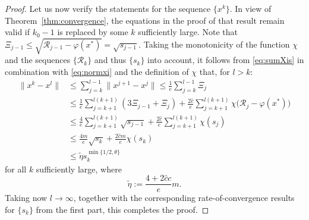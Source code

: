 \documentclass[10pt,a4paper]{amsart}
\newcommand{\Rvalue}{\mathcal{R}}
\newcommand{\xk}{x^k}
\begin{document}
\begin{proof}
Let us now verify the statements for the sequence $\{\xk\}$. In view of Theorem~\ref{thm:convergence}, the equations in the proof of that result remain valid if $k_0-1$ is replaced by some $k$ sufficiently large. Note that $\Xi_{j-1} \leq \sqrt{\Rvalue_{j-1} - \varphi(x^*)} = \sqrt{s_{j-1}}$. Taking the monotonicity of the function $\chi$ and the sequences $\{\Rvalue_k\}$ and thus $\{s_k\}$ into account, it follows from \eqref{eq:sumXis} in combination with \eqref{eq:normxi} and the definition of $\chi$ that, for $l>k$:
\begin{align*}
	\|\xk - x^l\| &\leq \sum_{j=k}^{l-1} \|x^{j+1}-x^j\| \leq \frac{1}{e} \sum_{j=k}^{l-1} \Xi_j  \\
	&\leq \frac{1}{e} \sum_{j=k+1}^{l(k+1)} (3\Xi_{j-1} + \Xi_j) + \frac{2 \hat c}{e} \sum_{j = k+1}^{l(k+1)}\chi \big( \Rvalue_j - \varphi(x^*) \big)\\
	&\leq \frac{4}{e} \sum_{j=k+1}^{l(k+1)} \sqrt{s_{j-1}} + \frac{2 \hat c}{e} \sum_{j = k+1}^{l(k+1)}\chi ( s_j )\\
	&\leq \frac{4m}{e} \sqrt{s_k} + \frac{2 \hat c m}{e}\chi ( s_k )\\
	&\leq \tilde \eta s_k^{\min\{1/2, \theta \}}
\end{align*}
for all $ k $ sufficiently large, where 
\begin{equation*}
\tilde \eta := \frac{4 + 2 \hat c c}{e}m.
\end{equation*}
Taking now $l \to \infty$, together with the corresponding rate-of-convergence results for $\{s_k\}$ from the first part, this completes the proof.
\end{proof}
\end{document}
